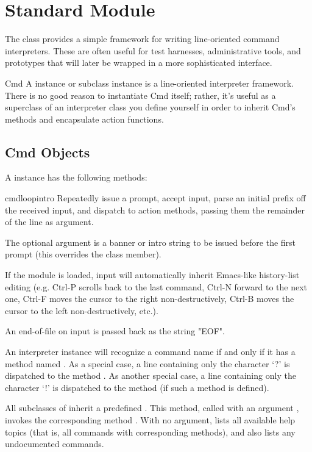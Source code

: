 \section{Standard Module }
\label{module-cmd}

The  class provides a simple framework for writing
line-oriented command interpreters.  These are often useful for
test harnesses, administrative tools, and prototypes that will
later be wrapped in a more sophisticated interface.

\begin{classdesc}{Cmd}{}
A  instance or subclass instance is a line-oriented
interpreter framework.  There is no good reason to instantiate Cmd
itself; rather, it's useful as a superclass of an interpreter class
you define yourself in order to inherit Cmd's methods and encapsulate
action functions.
\end{classdesc}

\subsection{Cmd Objects}
\label{Cmd-objects}

A  instance has the following methods:

\begin{methoddesc}{cmdloop}{intro}
Repeatedly issue a prompt, accept input, parse an initial prefix off
the received input, and dispatch to action methods, passing them the
remainder of the line as argument.

The optional argument is a banner or intro string to be issued before the
first prompt (this overrides the  class member).

If the  module is loaded, input will automatically
inherit Emacs-like history-list editing (e.g. Ctrl-P scrolls back to
the last command, Ctrl-N forward to the next one, Ctrl-F moves the
cursor to the right non-destructively, Ctrl-B moves the cursor to the
left non-destructively, etc.).

An end-of-file on input is passed back as the string "EOF".

An interpreter instance will recognize a command name  if
and only if it has a method named .  As a special case,
a line containing only the character `?' is dispatched to the method
.  As another special case, a line containing only the
character `!' is dispatched to the method  (if such a method
is defined).

All subclasses of  inherit a predefined .
This method, called with an argument , invokes the
corresponding method .  With no argument,
 lists all available help topics (that is, all
commands with corresponding  methods), and also lists any
undocumented commands.
\end{methoddesc}

